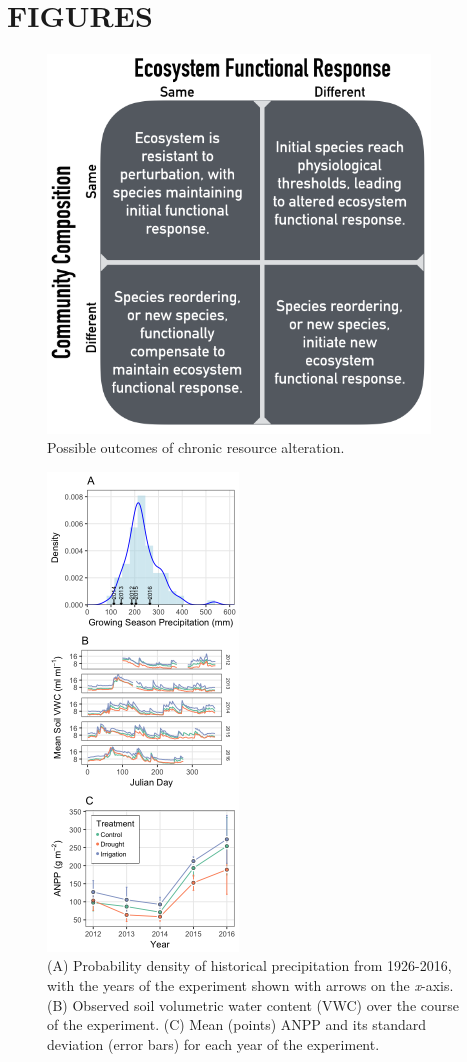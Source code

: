 \documentclass[fleqn,10pt,lineno]{wlpeerj} %
\begin{document}
\newpage{}

\section{FIGURES}\label{figures}

\begin{figure}[!ht]
  \centering
      \includegraphics[width=4in]{../figures/hypothesis_figtable.png}
  \caption{Possible outcomes of chronic resource alteration.}
\end{figure}

\newpage{}

\begin{figure}[!ht]
  \centering
      \includegraphics[height=5in]{../figures/Figure1.png}
  \caption{(A) Probability density of historical precipitation from 1926-2016, with the years of the experiment shown with arrows on the \emph{x}-axis. (B) Observed soil volumetric water content (VWC) over the course of the experiment. (C) Mean (points) ANPP and its standard deviation (error bars) for each year of the experiment.}
\end{figure}
\end{document}
